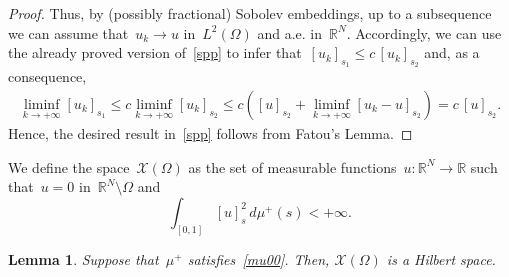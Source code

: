\documentclass[12pt,a4paper,intlimits,sumlimits]{amsart}
\def \R {\mathbb{R}}
\theoremstyle{definition}
\theoremstyle{plain}
\newtheorem{lemma}[definition]{Lemma}
\numberwithin{equation}{section}
\renewcommand{\le}{\leqslant}
\begin{document}
\begin{proof}
Thus, by (possibly fractional) Sobolev embeddings, up to a subsequence we can assume that~$u_k\to u$ in~$L^2(\Omega)$ and a.e. in~$\R^N$.
Accordingly, we can use the already proved version of~\eqref{spp} to infer that~$[u_k]_{s_1}\le c \, [u_k]_{s_2}$ and, as a consequence,
\begin{eqnarray*}
\liminf_{k\to+\infty}[u_k]_{s_1}\le c \liminf_{k\to+\infty} [u_k]_{s_2}\le c\left([u]_{s_2}+
\liminf_{k\to+\infty}[u_k-u]_{s_2}\right)=c\,[u]_{s_2}.
\end{eqnarray*}
Hence, the desired result in~\eqref{spp} follows 
from Fatou's Lemma.
\end{proof}

We define the space~$\mathcal{X}(\Omega)$ as the
set of measurable functions~$u:\R^N\to\R$ such that~$u=0$
in~$\R^N\setminus \Omega$ and
\begin{equation*}
\int_{[{{ 0 }}, 1]} [u]^2_{s}\, d\mu^+ (s) <+\infty.
\end{equation*}

\begin{lemma}\label{hilbert}
Suppose that~$\mu^+$ satisfies~\eqref{mu00}.
Then, $\mathcal{X}(\Omega)$ is a Hilbert space.
\end{lemma}
\end{document}
